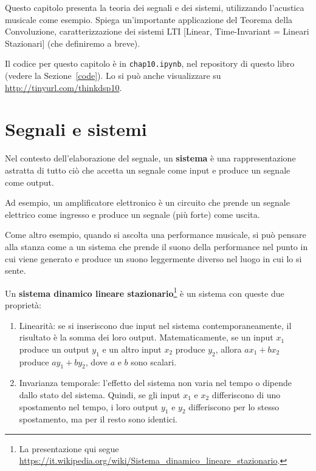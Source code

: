 \documentclass[12pt]{book} \usepackage[width=5.5in,height=8.5in, hmarginratio=3:2,vmarginratio=1:1]{geometry}
\begin{document}
Questo capitolo presenta la teoria dei segnali e dei sistemi, utilizzando l'acustica musicale come esempio. Spiega un'importante applicazione del Teorema della Convoluzione, caratterizzazione dei sistemi LTI [Linear, Time-Invariant = Lineari Stazionari] (che definiremo a breve).

Il codice per questo capitolo è in {\tt chap10.ipynb}, nel repository di questo libro (vedere la Sezione~\ref{code}). Lo si può anche visualizzare su \url{http://tinyurl.com/thinkdsp10}.

\section{Segnali e sistemi} 

Nel contesto dell'elaborazione del segnale, un {\bf sistema} è una rappresentazione astratta di tutto ciò che accetta un segnale come input e produce un segnale come output.

Ad esempio, un amplificatore elettronico è un circuito che prende un segnale elettrico come ingresso e produce un segnale (più forte) come uscita.

Come altro esempio, quando si ascolta una performance musicale, si può pensare alla stanza come a un sistema che prende il suono della performance nel punto in cui viene generato e produce un suono leggermente diverso nel luogo in cui lo si sente.

Un {\bf sistema dinamico lineare stazionario}\footnote{La presentazione qui segue \url{https://it.wikipedia.org/wiki/Sistema_dinamico_lineare_stazionario}.} è un sistema con queste due proprietà:

\begin{enumerate} 

\item Linearità: se si inseriscono due input nel sistema contemporaneamente, il risultato è la somma dei loro output. Matematicamente, se un input $x_1$ produce un output $y_1$ e un altro input $x_2$ produce $y_2$, allora $a x_1 + b x_2$ produce $a y_1 + b y_2$, dove $a$ e $b$ sono scalari.

\item Invarianza temporale: l'effetto del sistema non varia nel tempo o dipende dallo stato del sistema. Quindi, se gli input $x_1$ e $x_2$ differiscono di uno spostamento nel tempo, i loro output $y_1$ e $y_2$ differiscono per lo stesso spostamento, ma per il resto sono identici.

\end{enumerate} 
\end{document}

